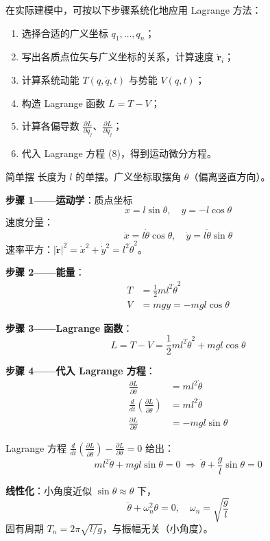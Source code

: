在实际建模中，可按以下步骤系统化地应用 Lagrange 方法：
\begin{enumerate}
	\item 选择合适的广义坐标 $q_1, \ldots, q_n$；
	\item 写出各质点位矢与广义坐标的关系，计算速度 $\dot{\mathbf{r}}_i$；
	\item 计算系统动能 $T(q, \dot{q}, t)$ 与势能 $V(q, t)$；
	\item 构造 Lagrange 函数 $L = T - V$；
	\item 计算各偏导数 $\frac{\partial L}{\partial q_j}$、$\frac{\partial L}{\partial \dot{q}_j}$；
	\item 代入 Lagrange 方程 (8)，得到运动微分方程。
\end{enumerate}

\begin{example}{简单摆}
	长度为 $l$ 的单摆。广义坐标取摆角 $\theta$（偏离竖直方向）。
	
	\textbf{步骤 1——运动学}：质点坐标
	\[
	x = l \sin\theta, \quad y = -l \cos\theta
	\]
	速度分量：
	\[
	\dot{x} = l \dot{\theta} \cos\theta, \quad \dot{y} = l \dot{\theta} \sin\theta
	\]
	速率平方：$|\dot{\mathbf{r}}|^2 = \dot{x}^2 + \dot{y}^2 = l^2 \dot{\theta}^2$。
	
	\textbf{步骤 2——能量}：
	\begin{align*}
		T &= \frac{1}{2} m l^2 \dot{\theta}^2 \\
		V &= mgy = -mgl \cos\theta
	\end{align*}
	
	\textbf{步骤 3——Lagrange 函数}：
	\[
	L = T - V = \frac{1}{2} m l^2 \dot{\theta}^2 + mgl \cos\theta
	\]
	
	\textbf{步骤 4——代入 Lagrange 方程}：
	\begin{align*}
		\frac{\partial L}{\partial \dot{\theta}} &= m l^2 \dot{\theta} \\
		\frac{d}{dt} \left( \frac{\partial L}{\partial \dot{\theta}} \right) &= m l^2 \ddot{\theta} \\
		\frac{\partial L}{\partial \theta} &= -mgl \sin\theta
	\end{align*}
	
	Lagrange 方程 $\frac{d}{dt} \left( \frac{\partial L}{\partial \dot{\theta}} \right) - \frac{\partial L}{\partial \theta} = 0$ 给出：
	\[
	m l^2 \ddot{\theta} + mgl \sin\theta = 0 \;\Longrightarrow\; \ddot{\theta} + \frac{g}{l} \sin\theta = 0
	\]
	
	\textbf{线性化}：小角度近似 $\sin\theta \approx \theta$ 下，
	\[
	\ddot{\theta} + \omega_n^2 \theta = 0, \quad \omega_n = \sqrt{\frac{g}{l}}
	\]
	固有周期 $T_n = 2\pi \sqrt{l/g}$，与振幅无关（小角度）。
\end{example}

